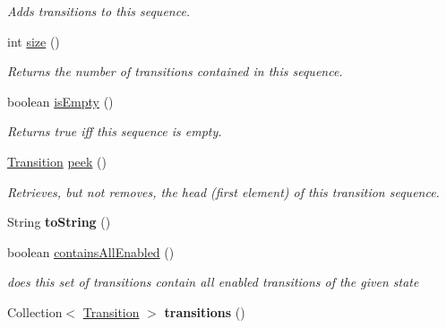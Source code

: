 \begin{DoxyCompactItemize}
\begin{DoxyCompactList}\small\item\em Adds transitions to this sequence. \end{DoxyCompactList}\item 
int \hyperlink{classedu_1_1udel_1_1cis_1_1vsl_1_1civl_1_1semantics_1_1common_1_1CommonTransitionSequence_a401bdeb41db095e2257b164b8d3cb96a}{size} ()
\begin{DoxyCompactList}\small\item\em Returns the number of transitions contained in this sequence. \end{DoxyCompactList}\item 
boolean \hyperlink{classedu_1_1udel_1_1cis_1_1vsl_1_1civl_1_1semantics_1_1common_1_1CommonTransitionSequence_a2d393d82341be207c6eb9854f86fa499}{is\+Empty} ()
\begin{DoxyCompactList}\small\item\em Returns true iff this sequence is empty. \end{DoxyCompactList}\item 
\hyperlink{interfaceedu_1_1udel_1_1cis_1_1vsl_1_1civl_1_1semantics_1_1IF_1_1Transition}{Transition} \hyperlink{classedu_1_1udel_1_1cis_1_1vsl_1_1civl_1_1semantics_1_1common_1_1CommonTransitionSequence_afe96ca98b3800e1125697752757a260f}{peek} ()
\begin{DoxyCompactList}\small\item\em Retrieves, but not removes, the head (first element) of this transition sequence. \end{DoxyCompactList}\item 
\hypertarget{classedu_1_1udel_1_1cis_1_1vsl_1_1civl_1_1semantics_1_1common_1_1CommonTransitionSequence_a0bffaf03dfa9e495ccddd7a30765985f}{}String {\bfseries to\+String} ()\label{classedu_1_1udel_1_1cis_1_1vsl_1_1civl_1_1semantics_1_1common_1_1CommonTransitionSequence_a0bffaf03dfa9e495ccddd7a30765985f}

\item 
boolean \hyperlink{classedu_1_1udel_1_1cis_1_1vsl_1_1civl_1_1semantics_1_1common_1_1CommonTransitionSequence_a9372bf5146f99ac25dfa474f108761b3}{contains\+All\+Enabled} ()
\begin{DoxyCompactList}\small\item\em does this set of transitions contain all enabled transitions of the given state \end{DoxyCompactList}\item 
\hypertarget{classedu_1_1udel_1_1cis_1_1vsl_1_1civl_1_1semantics_1_1common_1_1CommonTransitionSequence_a814ed09865f673caddf2f70243a928a3}{}Collection$<$ \hyperlink{interfaceedu_1_1udel_1_1cis_1_1vsl_1_1civl_1_1semantics_1_1IF_1_1Transition}{Transition} $>$ {\bfseries transitions} ()\label{classedu_1_1udel_1_1cis_1_1vsl_1_1civl_1_1semantics_1_1common_1_1CommonTransitionSequence_a814ed09865f673caddf2f70243a928a3}


\end{DoxyCompactItemize}
